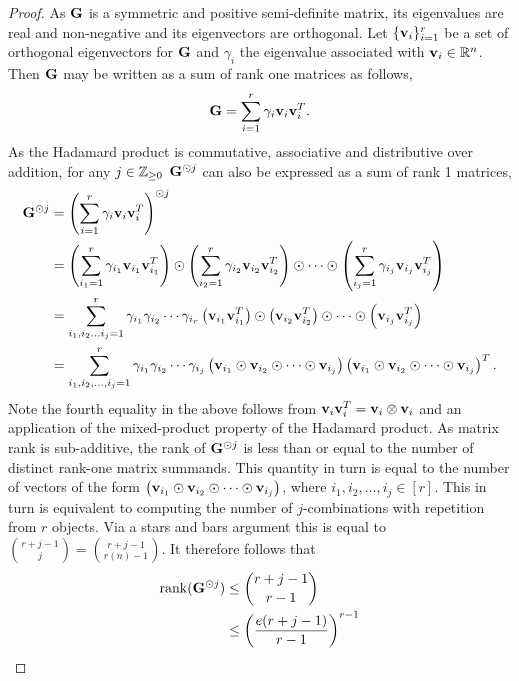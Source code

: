\begin{proof}
    As $\mathbf{G}$ is a symmetric and positive semi-definite matrix, its eigenvalues are real and non-negative and its eigenvectors are orthogonal. Let $\{ \mathbf v_i \}_{i=1}^r$ be a set of orthogonal eigenvectors for $\mathbf{G}$ and $\gamma_i$ the eigenvalue associated with $\mathbf v_i\in \mathbb{R}^n$. Then $\mathbf{G}$ may be written as a sum of rank one matrices as follows,
    \[
    \mathbf{G} = \sum_{i=1}^{r} \gamma_i \mathbf v_i \mathbf v_i^T.
    \]
    As the Hadamard product is commutative, associative and distributive over addition, for any $j\in \mathbb{Z}_{\geq 0}$  $\mathbf{G}^{\odot j}$ can also be expressed as a sum of rank 1 matrices,
    \[
    \begin{aligned}
    \mathbf{G}^{\odot j} &= \left(\sum_{i=1}^{r} \gamma_i \mathbf v_i \mathbf v_i^T\right)^{\odot j}\\
    & =  \left(\sum_{i_1=1}^{r} \gamma_{i_1} \mathbf v_{i_1} \mathbf v_{i_1}^T\right) \odot \left(\sum_{i_2=1}^{r} \gamma_{i_2} \mathbf v_{i_2} \mathbf v_{i_2}^T\right) \odot \cdots \odot\left(\sum_{i_j=1}^{r} \gamma_{i_j} \mathbf v_{i_j} \mathbf v_{i_j}^T\right)\\
    & = \sum_{i_1,i_2...i_j=1}^{r} \gamma_{i_1} \gamma_{i_2}\cdots \gamma_{i_r} \left( \mathbf v_{i_1} \mathbf v_{i_1}^T\right) \odot \left( \mathbf v_{i_2} \mathbf v_{i_2}^T\right)\odot\cdots\odot \left(\mathbf v_{i_j} \mathbf v_{i_j}^T \right)\\
    & = \sum_{i_1,i_2,\ldots, i_j=1}^{r} \gamma_{i_1} \gamma_{i_2}\cdots \gamma_{i_j} \left( \mathbf v_{i_1} \odot \mathbf v_{i_2}\odot\cdots \odot \mathbf v_{i_j}\right)\left( \mathbf v_{i_1} \odot \mathbf v_{i_2}\odot\cdots \odot \mathbf v_{i_j}\right)^T.
    \end{aligned}
    \]
    Note the fourth equality in the above follows from $\mathbf v_i \mathbf v_i^T = \mathbf v_i \otimes \mathbf v_i$ and an application of the mixed-product property of the Hadamard product. As matrix rank is sub-additive, the rank of $\mathbf{G}^{\odot j}$ is less than or equal to the number of distinct rank-one matrix summands. This quantity in turn is equal to the number of vectors of the form $\left( \mathbf v_{i_1} \odot \mathbf v_{i_2}\odot\cdots\odot \mathbf v_{i_j}\right)$, where $i_1, i_2,\ldots, i_j \in [r]$. This in turn is equivalent to computing the number of $j$-combinations with repetition from $r$ objects. 
    Via a stars and bars argument this is equal to $\binom{r+j-1}{j} = \binom{r+j-1}{r(n)-1}$. It therefore follows that
    \[
    \begin{aligned}
    \operatorname{rank}(\mG^{\odot j}) &\leq \binom{r+j-1}{r-1}\\
    & \leq \left(\frac{e(r+j-1)}{r-1} \right)^{r-1}\\

\end{aligned}\]
\end{proof}
